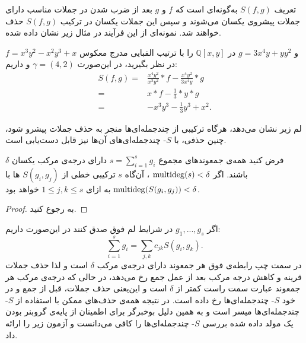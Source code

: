 تعریف 
$S(f, g)$
به‌گونه‌ای است که 
$f$
و
$g$
بعد از ضرب شدن در جملات مناسب دارای جملات پیشروی یکسان می‌شوند و سپس این جملات یکسان در ترکیب 
$S(f, g)$
حذف خواهند شد. نمونه‌ای از این فرآیند در مثال زیر نشان داده شده.
\begin{example}
$f = x^{3}y^{2} - x^{2}y^{3} + x$
و
$g = 3x^{4}y + yy^{2}$
در 
$\mathbb{Q}[x,y]$
را با ترتیب الفبایی مدرج معکوس در نظر بگیرید، در این‌صورت 
$\gamma = (4, 2)$
و داریم:
\begin{align*}
S(f, g) =& \frac{x^{4}y^{2}}{x^{3}y^{2}}*f - \frac{x^{4}y^{2}}{3x^{4}y}*g\\
 =& x*f - \frac{1}{3}*y*g\\
 =& -x^{3}y^{3} - \frac{1}{3}y^{3} + x^{2}.
\end{align*}
\end{example}
 
لم زیر نشان می‌دهد، هرگاه ترکیبی از چندجمله‌ای‌ها منجر به حذف جملات پیشرو شود، چنین حذفی، با 
$S$-
چندجمله‌ای‌های آن‌ها نیز قابل دست‌یابی است.
\begin{lemma}
فرض کنید همه‌ی جمعوندهای مجموع 
$s = \sum_{i = 1}^{s}g_{i}$
دارای درجه‌ی مرکب یکسان 
$\delta$
باشند. اگر 
$\operatorname{\mathrm{multideg}}(s)< \delta$
، آن‌گاه 
$s$
ترکیبی خطی از 
$S(g_{i}, g_{j})$
ها با 
$\operatorname{\mathrm{multideg}}(S(g_{i},g_{j}))<\delta$
به ازای 
$1\leq j,k\leq s$
خواهد بود. 
\end{lemma}
\begin{proof}
به 
\cite[ص، ۸۵]{IVAcox}
رجوع کنید.
\end{proof}

اگر 
$g_{1},...,g_{s}$
در شرایط لم فوق صدق کنند در این‌صورت داریم:
$$\sum_{i = 1}^{s}g_{i} = \sum_{j,k}c_{jk}S(g_{i}, g_{k}).$$
در سمت چپ رابطه‌ی فوق هر جمعوند دارای درجه‌ی مرکب 
$\delta$
است و لذا حذف جملات قرینه و کاهش درجه مرکب بعد از عمل جمع رخ می‌دهد، در حالی که درجه‌ی مرکب هر جمعوند عبارت سمت راست کمتر از 
$\delta$
است و این‌یعنی حذف جملات، قبل از جمع و در خود
$S$-
چندجمله‌ای‌ها رخ داده است. در نتیجه همه‌ی حذف‌های ممکن با استفاده از 
$S$-
چندجمله‌ای‌ها میسر است و به همین دلیل  بوخبرگر برای اطمینان از پایه‌ی گروبنر بودن یک مولد داده شده بررسی 
$S$-
چندجمله‌ای‌ها را کافی می‌دانست و آزمون زیر را ارائه داد.

